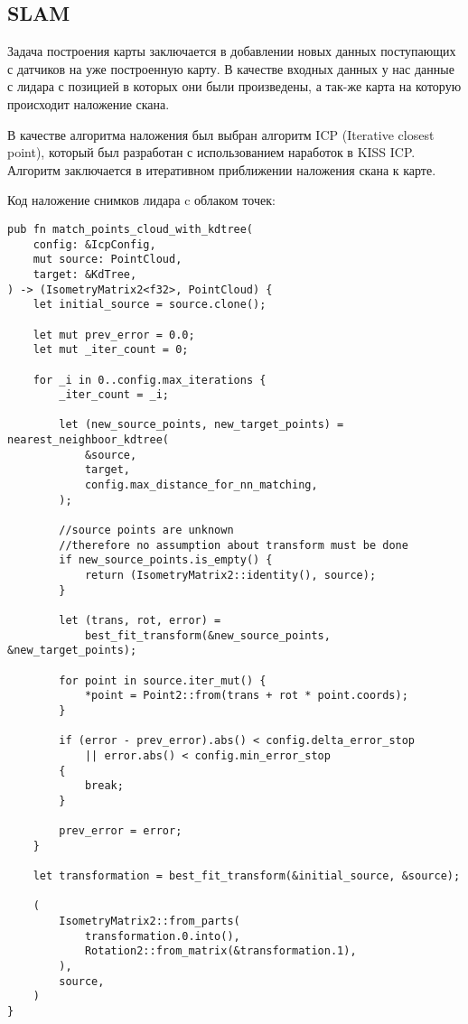 \subsection{SLAM}
Задача построения карты заключается в добавлении новых данных поступающих с
датчиков на уже построенную карту. В качестве входных данных у нас данные с
лидара с позицией в которых они были произведены, а так-же карта на которую
происходит наложение скана.

В качестве алгоритма наложения был выбран алгоритм ICP (Iterative closest
point), который был разработан с использованием наработок в KISS ICP. Алгоритм
заключается в итеративном приближении наложения скана к карте.

Код наложение снимков лидара c облаком точек:
\begin{lstlisting}
pub fn match_points_cloud_with_kdtree(
    config: &IcpConfig,
    mut source: PointCloud,
    target: &KdTree,
) -> (IsometryMatrix2<f32>, PointCloud) {
    let initial_source = source.clone();

    let mut prev_error = 0.0;
    let mut _iter_count = 0;

    for _i in 0..config.max_iterations {
        _iter_count = _i;

        let (new_source_points, new_target_points) = nearest_neighboor_kdtree(
            &source,
            target,
            config.max_distance_for_nn_matching,
        );

        //source points are unknown
        //therefore no assumption about transform must be done
        if new_source_points.is_empty() {
            return (IsometryMatrix2::identity(), source);
        }

        let (trans, rot, error) =
            best_fit_transform(&new_source_points, &new_target_points);

        for point in source.iter_mut() {
            *point = Point2::from(trans + rot * point.coords);
        }

        if (error - prev_error).abs() < config.delta_error_stop
            || error.abs() < config.min_error_stop
        {
            break;
        }

        prev_error = error;
    }

    let transformation = best_fit_transform(&initial_source, &source);

    (
        IsometryMatrix2::from_parts(
            transformation.0.into(),
            Rotation2::from_matrix(&transformation.1),
        ),
        source,
    )
}


\end{lstlisting}
